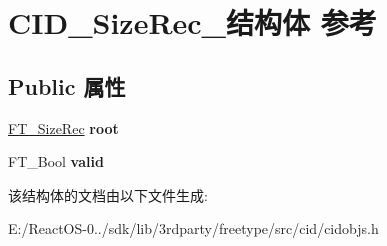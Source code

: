 \hypertarget{struct_c_i_d___size_rec__}{}\section{C\+I\+D\+\_\+\+Size\+Rec\+\_\+结构体 参考}
\label{struct_c_i_d___size_rec__}
\subsection*{Public 属性}
\begin{DoxyCompactItemize}
\item 
\mbox{\label{struct_c_i_d___size_rec___a1cdfb51148105a77b699bda3dd628765}} 
\hyperlink{struct_f_t___size_rec__}{F\+T\+\_\+\+Size\+Rec} {\bfseries root}
\item 
\mbox{\label{struct_c_i_d___size_rec___a6ef8879de28a88a016ea5324dd0d1e08}} 
F\+T\+\_\+\+Bool {\bfseries valid}
\end{DoxyCompactItemize}


该结构体的文档由以下文件生成\+:\begin{DoxyCompactItemize}
\item 
E\+:/\+React\+O\+S-\/0../sdk/lib/3rdparty/freetype/src/cid/cidobjs.\+h\end{DoxyCompactItemize}
